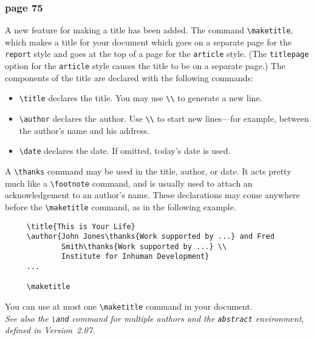 \subsubsection* {page 75}
A new feature for making a title has been added.  The command
\hbox{\verb"\maketitle"}, which makes a title for your document which
goes on a separate page for the \hbox{\verb"report"} style and goes at
the top of a page for the \hbox{\verb"article"} style.  (The
\hbox{\verb"titlepage"} option for the \hbox{\verb"article"} style
causes the title to be on a separate page.)  The components of the
title are declared with the following commands:
\begin{itemize}
  \item \verb"\title" declares the title.  You may use
    \hbox{\verb"\\"} to generate a new line.
  \item \verb"\author" declares the author.  Use \hbox{\verb"\\"}
    to start new lines---for example, between the author's name and his
    address.
  \item \verb"\date" declares the date.  If omitted, today's date
        is used.
\end{itemize}
A \hbox{\verb"\thanks"} command may be used in the title, author, or
date.  It acts pretty much like a \hbox{\verb"\footnote"} command,
and is usually used to attach an acknowledgement to an author's name.
These declarations may come anywhere before the \hbox{\verb"\maketitle"}
command, as in the following example.
\begin{verbatim}
     \title{This is Your Life}
     \author{John Jones\thanks{Work supported by ...} and Fred
             Smith\thanks{Work supported by ...} \\ 
             Institute for Inhuman Development}
     ...
     
     \maketitle
\end{verbatim}
You can use at most one \hbox{\verb"\maketitle"} command in your
document.\\
{\it See also the \hbox{\verb"\and"} command for\/ multiple
authors and the \hbox{\verb"abstract"} environment, defined in Version~2.07.}

